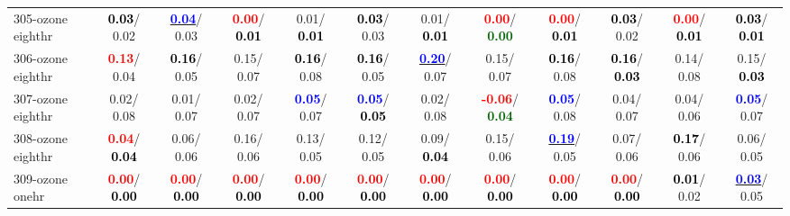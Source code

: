 \begin{table}[h]
\begin{center}
{\begin{tabular}{lc|c|c|c|c|c|c|c|c|c|c}
305-ozone eighthr & \textcolor{black}{\textbf{  0.03}}/  0.02 & \underline{\textcolor{blue}{\textbf{  0.04}}}/  0.03 & \textcolor{red}{\textbf{  0.00}}/\textcolor{black}{\textbf{  0.01}} &   0.01/\textcolor{black}{\textbf{  0.01}} & \textcolor{black}{\textbf{  0.03}}/  0.03 &   0.01/\textcolor{black}{\textbf{  0.01}} & \textcolor{red}{\textbf{  0.00}}/\textcolor{darkgreen}{\textbf{  0.00}} & \textcolor{red}{\textbf{  0.00}}/\textcolor{black}{\textbf{  0.01}} & \textcolor{black}{\textbf{  0.03}}/  0.02 & \textcolor{red}{\textbf{  0.00}}/\textcolor{black}{\textbf{  0.01}} & \textcolor{black}{\textbf{  0.03}}/\textcolor{black}{\textbf{  0.01}} \\
306-ozone eighthr & \textcolor{red}{\textbf{  0.13}}/  0.04 & \textcolor{black}{\textbf{  0.16}}/  0.05 &   0.15/  0.07 & \textcolor{black}{\textbf{  0.16}}/  0.08 & \textcolor{black}{\textbf{  0.16}}/  0.05 & \underline{\textcolor{blue}{\textbf{  0.20}}}/  0.07 &   0.15/  0.07 & \textcolor{black}{\textbf{  0.16}}/  0.08 & \textcolor{black}{\textbf{  0.16}}/\textcolor{black}{\textbf{  0.03}} &   0.14/  0.08 &   0.15/\textcolor{black}{\textbf{  0.03}} \\
307-ozone eighthr &   0.02/  0.08 &   0.01/  0.07 &   0.02/  0.07 & \textcolor{blue}{\textbf{  0.05}}/  0.07 & \textcolor{blue}{\textbf{  0.05}}/\textcolor{black}{\textbf{  0.05}} &   0.02/  0.08 & \textcolor{red}{\textbf{ -0.06}}/\textcolor{darkgreen}{\textbf{  0.04}} & \textcolor{blue}{\textbf{  0.05}}/  0.08 &   0.04/  0.07 &   0.04/  0.06 & \textcolor{blue}{\textbf{  0.05}}/  0.07 \\
308-ozone eighthr & \textcolor{red}{\textbf{  0.04}}/\textcolor{black}{\textbf{  0.04}} &   0.06/  0.06 &   0.16/  0.06 &   0.13/  0.05 &   0.12/  0.05 &   0.09/\textcolor{black}{\textbf{  0.04}} &   0.15/  0.06 & \underline{\textcolor{blue}{\textbf{  0.19}}}/  0.05 &   0.07/  0.06 & \textcolor{black}{\textbf{  0.17}}/  0.06 &   0.06/  0.05 \\
309-ozone onehr & \textcolor{red}{\textbf{  0.00}}/\textcolor{black}{\textbf{  0.00}} & \textcolor{red}{\textbf{  0.00}}/\textcolor{black}{\textbf{  0.00}} & \textcolor{red}{\textbf{  0.00}}/\textcolor{black}{\textbf{  0.00}} & \textcolor{red}{\textbf{  0.00}}/\textcolor{black}{\textbf{  0.00}} & \textcolor{red}{\textbf{  0.00}}/\textcolor{black}{\textbf{  0.00}} & \textcolor{red}{\textbf{  0.00}}/\textcolor{black}{\textbf{  0.00}} & \textcolor{red}{\textbf{  0.00}}/\textcolor{black}{\textbf{  0.00}} & \textcolor{red}{\textbf{  0.00}}/\textcolor{black}{\textbf{  0.00}} & \textcolor{red}{\textbf{  0.00}}/\textcolor{black}{\textbf{  0.00}} & \textcolor{black}{\textbf{  0.01}}/  0.02 & \underline{\textcolor{blue}{\textbf{  0.03}}}/  0.05 \\ \hline

\end{tabular}}
\end{center}
\end{table}
